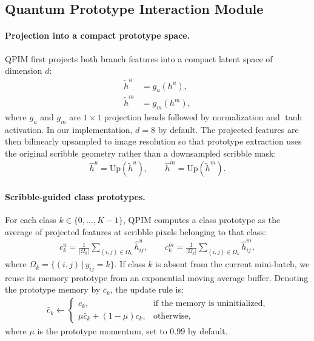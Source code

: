 \subsection{Quantum Prototype Interaction Module}
\label{subsec:qpim}
\paragraph{Projection into a compact prototype space.}
QPIM first projects both branch features into a compact latent space of dimension $d$:
\begin{align}
    \tilde{h}^u &= g_u(h^u), \\
    \tilde{h}^m &= g_m(h^m),
\end{align}
where $g_u$ and $g_m$ are $1 \times 1$ projection heads followed by normalization and $\tanh$ activation. In our implementation, $d=8$ by default. The projected features are then bilinearly upsampled to image resolution so that prototype extraction uses the original scribble geometry rather than a downsampled scribble mask:
\begin{align}
    \hat{h}^u = \mathrm{Up}(\tilde{h}^u), \qquad
    \hat{h}^m = \mathrm{Up}(\tilde{h}^m).
\end{align}

\paragraph{Scribble-guided class prototypes.}
For each class $k \in \{0,\dots,K-1\}$, QPIM computes a class prototype as the average of projected features at scribble pixels belonging to that class:
\begin{align}
    c_k^u = \frac{1}{|\Omega_k|} \sum_{(i,j)\in\Omega_k} \hat{h}_{ij}^u, \qquad
    c_k^m = \frac{1}{|\Omega_k|} \sum_{(i,j)\in\Omega_k} \hat{h}_{ij}^m,
\end{align}
where $\Omega_k = \{(i,j)\,|\, y_{ij}=k\}$. If class $k$ is absent from the current mini-batch, we reuse its memory prototype from an exponential moving average buffer. Denoting the prototype memory by $\bar{c}_k$, the update rule is:
\begin{align}
    \bar{c}_k \leftarrow
    \begin{cases}
    c_k, & \text{if the memory is uninitialized}, \\
    \mu \bar{c}_k + (1-\mu)c_k, & \text{otherwise},
    \end{cases}
\end{align}
where $\mu$ is the prototype momentum, set to $0.99$ by default.

